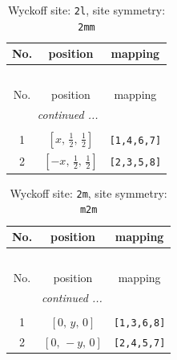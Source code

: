 \documentclass[fleqn,8pt]{jsarticle}
\begin{document}
\renewcommand{\arraystretch}{1.2}
\begin{longtable}{ccc}
\caption{Wyckoff site: {\tt 2l}, site symmetry: {\tt 2mm}}
 \\
 \hline \hline
No. & position & mapping \\ \hline \endfirsthead

\multicolumn{2}{l}{\tablename\ \thetable{}} \\
 \hline \hline
No. & position & mapping \\ \hline \endhead

 \hline \hline
\multicolumn{2}{r}{\footnotesize\it continued ...} \\ \endfoot

 \hline \hline
\multicolumn{2}{r}{} \\ \endlastfoot

1 & $\left[ x,\, \frac{1}{2},\, \frac{1}{2} \right]$ & {\tt [1,4,6,7]} \\ \hline
2 & $\left[ - x,\, \frac{1}{2},\, \frac{1}{2} \right]$ & {\tt [2,3,5,8]} \\
\end{longtable}
\renewcommand{\arraystretch}{1.2}
\begin{longtable}{ccc}
\caption{Wyckoff site: {\tt 2m}, site symmetry: {\tt m2m}}
 \\
 \hline \hline
No. & position & mapping \\ \hline \endfirsthead

\multicolumn{2}{l}{\tablename\ \thetable{}} \\
 \hline \hline
No. & position & mapping \\ \hline \endhead

 \hline \hline
\multicolumn{2}{r}{\footnotesize\it continued ...} \\ \endfoot

 \hline \hline
\multicolumn{2}{r}{} \\ \endlastfoot

1 & $\left[ 0,\, y,\, 0 \right]$ & {\tt [1,3,6,8]} \\ \hline
2 & $\left[ 0,\, - y,\, 0 \right]$ & {\tt [2,4,5,7]} \\
\end{longtable}
\renewcommand{\arraystretch}{1.2}
\end{document}
